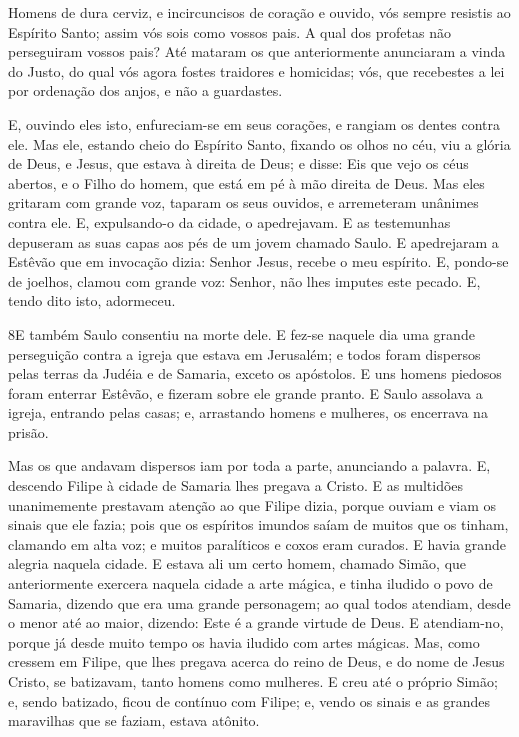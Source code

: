 Homens de dura cerviz, e incircuncisos de coração e ouvido, vós
sempre resistis ao Espírito Santo; assim vós sois como vossos pais.
A qual dos profetas não perseguiram vossos pais? Até mataram
os que anteriormente anunciaram a vinda do Justo, do qual vós agora
fostes traidores e homicidas; vós, que recebestes a lei por
ordenação dos anjos, e não a guardastes.

E, ouvindo eles isto, enfureciam-se em seus corações, e rangiam
os dentes contra ele. Mas ele, estando cheio do Espírito
Santo, fixando os olhos no céu, viu a glória de Deus, e Jesus, que
estava à direita de Deus; e disse: Eis que vejo os céus
abertos, e o Filho do homem, que está em pé à mão direita de Deus.
Mas eles gritaram com grande voz, taparam os seus ouvidos, e
arremeteram unânimes contra ele. E, expulsando-o da cidade, o
apedrejavam. E as testemunhas depuseram as suas capas aos pés de um
jovem chamado Saulo. E apedrejaram a Estêvão que em invocação
dizia: Senhor Jesus, recebe o meu espírito. E, pondo-se de
joelhos, clamou com grande voz: Senhor, não lhes imputes este
pecado. E, tendo dito isto, adormeceu.

\medskip

\lettrine{8} E também Saulo consentiu na morte dele. E fez-se
naquele dia uma grande perseguição contra a igreja que estava em
Jerusalém; e todos foram dispersos pelas terras da Judéia e de
Samaria, exceto os apóstolos. E uns homens piedosos foram
enterrar Estêvão, e fizeram sobre ele grande pranto. E Saulo
assolava a igreja, entrando pelas casas; e, arrastando homens e
mulheres, os encerrava na prisão.

Mas os que andavam dispersos iam por toda a parte, anunciando a
palavra. E, descendo Filipe à cidade de Samaria lhes pregava a
Cristo. E as multidões unanimemente prestavam atenção ao que
Filipe dizia, porque ouviam e viam os sinais que ele fazia; pois
que os espíritos imundos saíam de muitos que os tinham, clamando em
alta voz; e muitos paralíticos e coxos eram curados. E havia
grande alegria naquela cidade. E estava ali um certo homem,
chamado Simão, que anteriormente exercera naquela cidade a arte
mágica, e tinha iludido o povo de Samaria, dizendo que era uma
grande personagem; ao qual todos atendiam, desde o menor até
ao maior, dizendo: Este é a grande virtude de Deus. E
atendiam-no, porque já desde muito tempo os havia iludido com artes
mágicas. Mas, como cressem em Filipe, que lhes pregava acerca
do reino de Deus, e do nome de Jesus Cristo, se batizavam, tanto
homens como mulheres. E creu até o próprio Simão; e, sendo
batizado, ficou de contínuo com Filipe; e, vendo os sinais e as
grandes maravilhas que se faziam, estava atônito.

